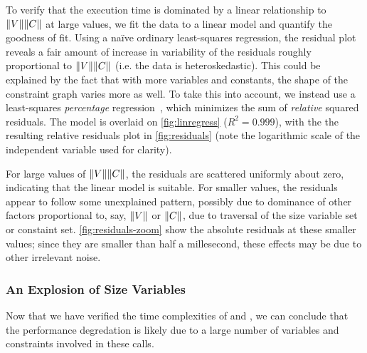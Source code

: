 To verify that the execution time is dominated by a linear relationship to $\lVert V\rVert\lVert C\rVert$ at large values, we fit the data to a linear model and quantify the goodness of fit.
Using a na\"ive ordinary least-squares regression, the residual plot reveals a fair amount of increase in variability of the residuals roughly proportional to $\lVert V\rVert\lVert C\rVert$ (i.e. the data is heteroskedastic).
This could be explained by the fact that with more variables and constants, the shape of the constraint graph varies more as well.
To take this into account, we instead use a least-squares \emph{percentage} regression~\citep{lspr},
which minimizes the sum of \emph{relative} squared residuals.
The model is overlaid on \autoref{fig:linregress} ($R^2 = 0.999$), with the the resulting relative residuals plot in \autoref{fig:residuals}
(note the logarithmic scale of the independent variable used for clarity).

For large values of $\lVert V\rVert\lVert C\rVert$, the residuals are scattered uniformly about zero, indicating that the linear model is suitable.
For smaller values, the residuals appear to follow some unexplained pattern,
possibly due to dominance of other factors proportional to, say, $\lVert V\rVert$ or $\lVert C\rVert$, due to traversal of the size variable set or constaint set.
\autoref{fig:residuals-zoom} show the absolute residuals at these smaller values;
since they are smaller than half a millesecond, these effects may be due to other irrelevant noise.

\subsubsection{An Explosion of Size Variables}

Now that we have verified the time complexities of \solve and \RecCheck,
we can conclude that the performance degredation is likely due to a large number of variables and constraints involved in these calls.
